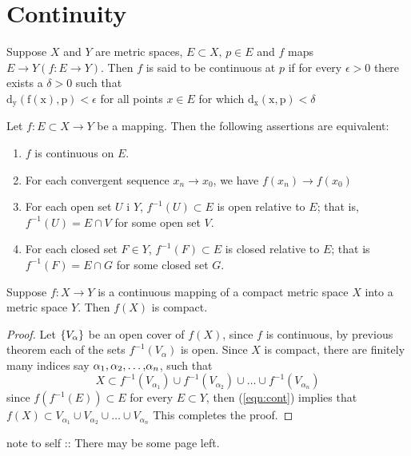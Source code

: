 \documentclass[../main-sheet.tex]{subfiles}
\begin{document}
\section{Continuity}
\begin{defn}[Continuity]
    Suppose $ X $ and $ Y $ are metric spaces, $ E\subset X,\,p\in E $ and $ f $ maps $ E \to Y (f:E\to Y) $. Then $ f $ is said to be continuous at $ p $ if for every $ \epsilon>0 $ there exists a $ \delta>0 $ such that\\
    \indent $ \mathrm{d_y(f(x), p)}<\epsilon $ for all points $ x \in E $ for which $ \mathrm{d_x(x,p)} <\delta$
\end{defn}
\begin{thm}
    Let $ f:E\subset X\to Y $ be a mapping. Then the following assertions are equivalent:
    \begin{enumerate}[label=(\roman*)]
        \item $ f $ is continuous on $ E $.
        \item For each convergent sequence $ x_n \to x_0 $, we have $ f(x_n) \to f(x_0) $
        \item For each open set $ U $ i $ Y $, $ f^{-1}(U)\subset E $ is open relative to $ E $; that is, $ f^{-1}(U)=E\cap V $ for some open set $ V $.
        \item For each closed set $ F\in Y $, $ f^{-1}(F)\subset E $ is closed relative to $ E $; that is $ f^{-1}(F)=E\cap G $ for some closed set $ G $.
    \end{enumerate}
\end{thm}
\begin{thm}
    Suppose $ f: X\to Y $ is a continuous mapping of a compact metric space $ X $ into a metric space $ Y $. Then $ f(X) $ is compact.
\end{thm}
\begin{proof}
    Let $ \left\{V_\alpha\right\} $ be an open cover of $ f(X) $, since $ f $ is continuous, by previous theorem each of the sets $ f^{-1}(V_\alpha) $ is open. Since $ X $ is compact, there are finitely many indices say $ {\alpha}_1{,}\,{\alpha}_2{,}\dots{,}{\alpha}_n $, such that
    \begin{equation}
        X\subset f^{-1}(V_{\alpha_1})\cup f^{-1}(V_{\alpha_2})\cup \dots\cup f^{-1}(V_{\alpha_n}) \label{eqn:cont}
    \end{equation}
    since $ f(f^{-1}(E))\subset E $ for every $ E\subset Y $, then (\ref{eqn:cont}) implies that $ f(X)\subset V_{\alpha_1}\cup V_{\alpha_2}\cup \dots \cup V_{\alpha_n} $
    This completes the proof.
\end{proof}
note to self :: There may be some page left.
\end{document}
